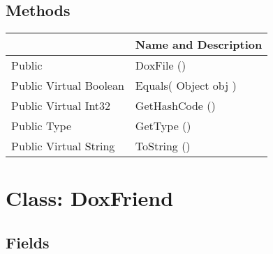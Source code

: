 \documentclass[11pt, oneside, a4paper]{book}
\begin{document}
\subsection{Methods}
\begin{center}
\begin{tabular}{| p{3cm} | p{12cm} | }
\hline
\textbf{ } & \textbf{ Name and Description}\\
\hline
 Public  &  DoxFile ()\hypertarget{SoftwareEngineeringTools.{}Documentation.{}DoxFile.{}DoxFile}{}\\
\hline
 Public  Virtual  Boolean &  Equals(\hypertarget{SoftwareEngineeringTools.{}Documentation.{}DoxFile.{}Equals\_Object}{} Object  obj  )\\
\hline
 Public  Virtual  Int32 &  GetHashCode ()\hypertarget{SoftwareEngineeringTools.{}Documentation.{}DoxFile.{}GetHashCode}{}\\
\hline
 Public  Type &  GetType ()\hypertarget{SoftwareEngineeringTools.{}Documentation.{}DoxFile.{}GetType}{}\\
\hline
 Public  Virtual  String &  ToString ()\hypertarget{SoftwareEngineeringTools.{}Documentation.{}DoxFile.{}ToString}{}\\
\hline
\end{tabular}
\end{center}
 


\hypertarget{SoftwareEngineeringTools.{}Documentation.{}DoxFriend}{}
\section{Class: DoxFriend}

\subsection{Fields}
\end{document}
